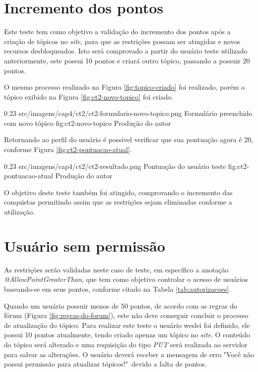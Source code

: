 \section{Incremento dos pontos}

\par Este teste tem como objetivo a validação do incremento dos pontos após a criação de tópicos no \textit{site}, para que as restrições possam ser atingidas e novos recursos desbloqueados. Isto será comprovado a partir do usuário teste utilizado anteriormente, este possui 10 pontos e criará outro tópico, passando a possuir 20 pontos.

\par O mesmo processo realizado na Figura \ref{fig:topico-criado} foi realizado, porém o tópico exibido na Figura \ref{fig:ct2-novo-topico} foi criado.

\begin{image}
{0.23}
{src/imagens/cap4/ct2/ct2-formulario-novo-topico.png}
{Formulário preenchido com novo tópico}
{fig:ct2-novo-topico}
{Produção do autor}
\end{image}

\par Retornando ao perfil do usuário é possível verificar que sua pontuação agora é 20, conforme Figura \ref{fig:ct2-pontuacao-atual}.

\begin{image}
{0.23}
{src/imagens/cap4/ct2/ct2-resultado.png}
{Pontuação do usuário teste}
{fig:ct2-pontuacao-atual}
{Produção do autor}
\end{image}

\par O objetivo deste teste também foi atingido, comprovando o incremento das conquistas permitindo assim que as restrições sejam eliminadas conforme a utilização.

\section{Usuário sem permissão}

\par As restrições serão validadas neste caso de teste, em específico a anotação \textit{@AllowPointGreaterThan}, que tem como objetivo controlar o acesso de usuários baseando-se em seus pontos, conforme citado na Tabela \ref{tab:autorizacoes}.
\par Quando um usuário possuir menos de 50 pontos, de acordo com as regras do fórum (Figura \ref{fig:regras-do-forum}), este não deve conseguir concluir o processo de atualização do tópico. Para realizar este teste o usuário weslei foi definido, ele possui 10 pontos atualmente, tendo criado apenas um tópico no \textit{site}. O conteúdo do tópico será alterado e uma requisição do tipo \textit{PUT} será realizada ao servidor para salvar as alterações. O usuário deverá receber a mensagem de erro "Você não possui permissão para atualizar tópicos!"\ devido a falta de pontos.

